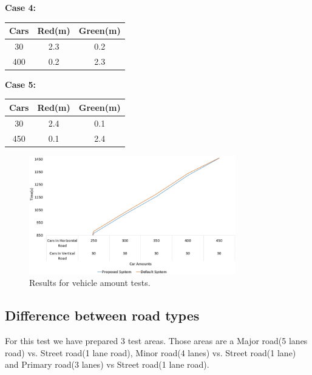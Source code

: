 \documentclass[conference]{IEEEtran}
\begin{document}

\begin{table}[h!]
	\centering\textbf{Case 4:}
	\centering
	\begin{tabular}{||c c c||} 
		\hline
		\textbf{Cars} & \textbf{Red(m)} & \textbf{Green(m)} \\ [0.5ex] 
		\hline\hline
		30   & 2.3    & 0.2      \\ 
		\hline
		400  & 0.2    & 2.3      \\
		\hline
		
	\end{tabular}
\end{table}


\begin{table}[h!]
	\centering\textbf{Case 5:}
	\centering
	\begin{tabular}{||c c c||} 
		\hline
		\textbf{Cars} & \textbf{Red(m)} & \textbf{Green(m)} \\ [0.5ex] 
		\hline\hline
		30   & 2.4    & 0.1      \\ 
		\hline
		450  & 0.1    & 2.4      \\
		\hline
		
	\end{tabular}
\end{table}


 \begin{figure}[h!]
     \centering
     \includegraphics[width=9cm]{vehDif.jpg}
     
     \caption{Results for vehicle amount tests.}
     \label{fig:my_label}
     
 \end{figure} 



\subsection{Difference between road types}
\par For this test we have prepared 3 test areas. Those areas are a Major road(5 lanes road) vs. Street road(1 lane road), Minor road(4 lanes) vs. Street road(1 lane) and Primary road(3 lanes) vs Street road(1 lane road). 
\end{document}

